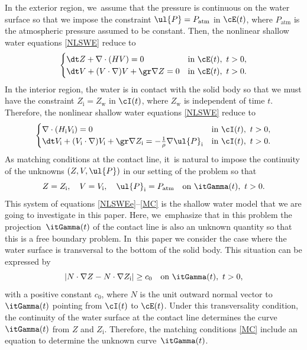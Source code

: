 In the exterior region, we~assume that the pressure is continuous on the water surface so that we impose the constraint $\ul{P}=P_\mathrm{atm}$ in $\cE(t)$,
where $P_\mathrm{atm}$ is the atmospheric pressure assumed to be constant.
Then, the nonlinear shallow water equations \eqref{NLSWE} reduce to
\begin{equation}\label{NLSWEe}
\begin{cases}
\dt Z+\nabla\cdot(HV) = 0 &\text{in } \cE(t), \ t>0, \\
\dt V+(V\cdot\nabla)V+\gr\nabla Z = 0 &\text{in } \cE(t), \ t>0.
\end{cases}
\end{equation}
In the interior region, the water is in contact with the solid body so that we must have the constraint $Z_\mathrm{i}=Z_\mathrm{w}$ in $\cI(t)$,
where $Z_\mathrm{w}$ is independent of time $t$.
Therefore, the nonlinear shallow water equations \eqref{NLSWE} reduce to
\begin{equation}\label{NLSWEi}
\begin{cases}
\nabla\cdot(H_\mathrm{i}V_\mathrm{i}) = 0 &\text{in } \cI(t), \ t>0, \\
\dt V_\mathrm{i}+(V_\mathrm{i}\cdot\nabla)V_\mathrm{i}+\gr\nabla Z_\mathrm{i} = -\frac{1}{\rho}\nabla\ul{P}_\mathrm{i} &\text{in } \cI(t), \ t>0.
\end{cases}
\end{equation}
As matching conditions at the contact line, it~is natural to impose the continuity of the unknowns $(Z,V,\ul{P})$ in our setting of the problem so that
\begin{equation}\label{MC}
Z=Z_\mathrm{i}, \quad V=V_\mathrm{i}, \quad \ul{P}_\mathrm{i}=P_\mathrm{atm} \quad\text{on } \itGamma(t), \ t>0.
\end{equation}
This system of equations \eqref{NLSWEe}--\eqref{MC} is the shallow water model that we are going to investigate in this paper.
Here, we~emphasize that in this problem the projection~$\itGamma(t)$ of the contact line is also an unknown quantity so that this is a free boundary problem. In~this paper we consider the case where the water surface is transversal to the bottom of the solid body.
This situation can be expressed by
\begin{equation}\label{TransCond}
|N\cdot\nabla Z-N\cdot\nabla Z_\mathrm{i}| \geq c_0 \quad\text{on } \itGamma(t), \ t>0,
\end{equation}
with a positive constant $c_0$, where $N$ is the unit outward normal vector to $\itGamma(t)$ pointing from $\cI(t)$ to $\cE(t)$.
Under this transversality condition, the continuity of the water surface at the contact line determines the curve $\itGamma(t)$ from $Z$ and $Z_\mathrm{i}$.
Therefore, the matching conditions \eqref{MC} include an equation to determine the unknown curve~$\itGamma(t)$.

